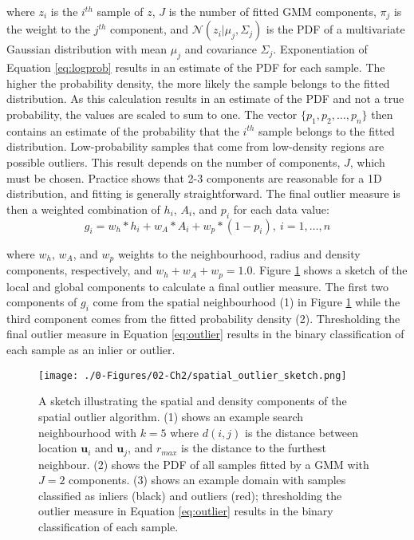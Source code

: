 \lowercase{Where} $z_{i}$ is the $i^{th}$ sample of $z$, $J$ is the number of fitted \gls{GMM} components, $\pi_{j}$ is the weight to the $j^{th}$ component, and $\mathcal{N}(z_{i}|\mu_{j}, \Sigma_{j})$ is the \gls{PDF} of a multivariate Gaussian distribution with mean $\mu_{j}$ and covariance $\Sigma_{j}$. Exponentiation of Equation \ref{eq:logprob} results in an estimate of the \gls{PDF} for each sample. The higher the probability density, the more likely the sample belongs to the fitted distribution. As this calculation results in an estimate of the \gls{PDF} and not a true probability, the values are scaled to sum to one. The vector $\{p_{1}, p_{2}, \dots, p_{n}\}$ then contains an estimate of the probability that the $i^{th}$ sample belongs to the fitted distribution. Low-probability samples that come from low-density regions are possible outliers. This result depends on the number of components, $J$, which must be chosen. Practice shows that 2-3 components are reasonable for a \gls{1D} distribution, and fitting is generally straightforward. The final outlier measure is then a weighted combination of $h_{i}$, $A_{i}$, and $p_{i}$ for each data value:
\begin{equation}
    g_{i} = w_{h}*h_{i} + w_{A}*A_{i} + w_{p}*(1-p_{i}), \ i = 1, \dots, n
    \label{eq:outlier}
\end{equation}

\lowercase{Where} $w_{h}$, $w_{A}$, and $w_{p}$ weights to the neighbourhood, radius and density components, respectively, and $w_{h}+w_{A}+w_{p}=1.0$. Figure \ref{fig:spatial_outlier_sketch} shows a sketch of the local and global components to calculate a final outlier measure. The first two components of $g_{i}$ come from the spatial neighbourhood (1) in Figure \ref{fig:spatial_outlier_sketch} while the third component comes from the fitted probability density (2). Thresholding the final outlier measure in Equation \ref{eq:outlier} results in the binary classification of each sample as an inlier or outlier.

\begin{figure}[htb!]
    \centering
    \texttt{[image: ./0-Figures/02-Ch2/spatial\_outlier\_sketch.png]}
    \caption{A sketch illustrating the spatial and density components of the spatial outlier algorithm. (1) shows an example search neighbourhood with $k=5$ where $d(i,j)$ is the distance between location $\mathbf{u}_{i}$ and $\mathbf{u}_{j}$, and $r_{max}$ is the distance to the furthest neighbour. (2) shows the \gls{PDF} of all samples fitted by a \gls{GMM} with $J=2$ components. (3) shows an example domain with samples classified as inliers (black) and outliers (red); thresholding the outlier measure in Equation \ref{eq:outlier} results in the binary classification of each sample.}
    \label{fig:spatial_outlier_sketch}
\end{figure}

